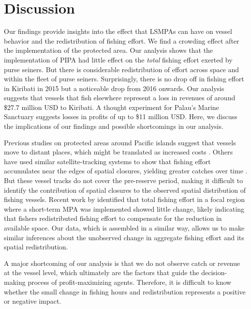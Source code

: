 \documentclass[9p,twocolumn,twoside,lineno]{pnas-new}
\begin{document}
\section{Discussion}

Our findings provide insights into the effect that LSMPAs can have on vessel behavior and the redistribution of fishing effort. We find a crowding effect after the implementation of the protected area. Our analysis shows that the implementation of PIPA had little effect on the \emph{total} fishing effort exerted by purse seiners. 
But there is considerable redistribution of effort across space and within the fleet of purse seiners. Surprisingly, there is no drop off in fishing effort in Kiribati in 2015 but a noticeable drop from 2016 onwards.
Our analysis suggests that vessels that fish elsewhere represent a loss in revenues of around \$27.7 million USD to Kiribati. A thought experiment for Palau's Marine Sanctuary suggests losses in profits of up to \$11 million USD. Here, we discuss the implications of our findings and possible shortcomings in our analysis.

Previous studies on protected areas around Pacific islands suggest that vessels move to distant places, which might be translated as increased costs \citep{stevenson_2013}. Others have used similar satellite-tracking systems to show that fishing effort accumulates near the edges of spatial closures, yielding greater catches over time \citep{murawski_2005}. But these vessel tracks do not cover the pre-reserve period, making it difficult to identify the contribution of spatial closures to the observed spatial distribution of fishing vessels. Recent work by \cite{elahi_2018} identified that total fishing effort in a focal region where a short-term MPA was implemented showed little change, likely indicating that fishers redistributed fishing effort to compensate for the reduction in available space. Our data, which is assembled in a similar way, allows us to make similar inferences about the unobserved change in aggregate fishing effort and its spatial redistribution.

A major shortcoming of our analysis is that we do not observe catch or revenue at the vessel level, which ultimately are the factors that guide the decision-making process of profit-maximizing agents. Therefore, it is difficult to know whether the small change in fishing hours and redistribution represents a positive or negative impact. 
\end{document}
